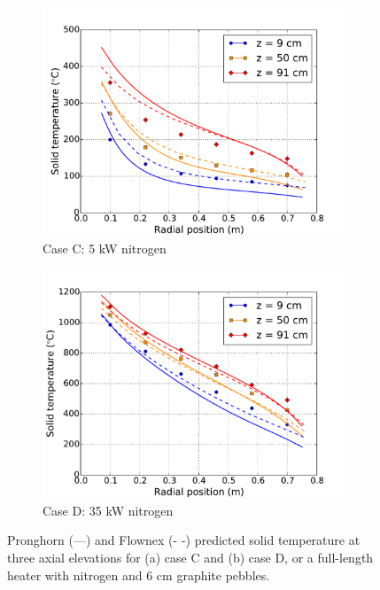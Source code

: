 \begin{figure}[h!]
    \begin{subfigure}{0.5\linewidth}
        \centering
        \includegraphics[height=0.75\linewidth]{figs/exp_total_G.pdf}
       \caption{Case C: 5 \si{\kilo\watt} nitrogen}
       \label{fig:nitrogen_longa}
    \end{subfigure}
    \begin{subfigure}{0.5\linewidth}
        \centering
        \includegraphics[height=0.75\linewidth]{figs/exp_total_L.pdf}
        \caption{Case D: 35 \si{\kilo\watt} nitrogen}
        \label{fig:nitrogen_longb}
    \end{subfigure}
    \caption{Pronghorn (---) and Flownex (- -) predicted solid temperature at three axial elevations for (a) case C and (b) case D, or a full-length heater with nitrogen and 6 \si{\centi\meter} graphite pebbles.}
    \label{fig:nitrogen_long}
\end{figure}

